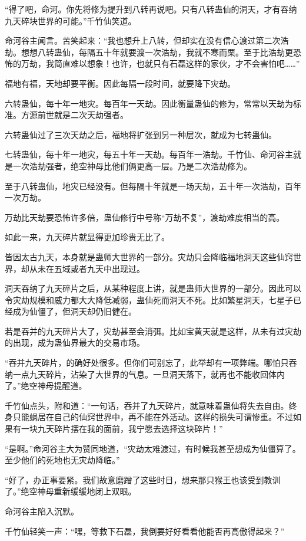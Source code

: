 \begin{this_body}
“得了吧，命河。你先将修为提升到八转再说吧。只有八转蛊仙的洞天，才有吞纳九天碎块世界的可能。”千竹仙笑道。

命河谷主闻言。苦笑起来：“我也想升上八转，但却实在没有信心渡过第二次浩劫。想想八转蛊仙，每隔五十年就要渡一次浩劫，我就不寒而栗。至于比浩劫更恐怖的万劫，我简直难以想象！也许，也就只有石磊这样的家伙，才不会害怕吧……”

福地有福，天地却要平衡。因此每隔一段时间，就要降下灾劫。

六转蛊仙，每十年一地灾。每百年一天劫。因此衡量蛊仙的修为，常常以天劫为标准。方源前世就是二次天劫强者。

六转蛊仙过了三次天劫之后，福地将扩张到另一种层次，就成为七转蛊仙。

七转蛊仙，每十年一地灾，每五十年一天劫。每百年一浩劫。千竹仙、命河谷主就是一次浩劫强者，绝空神母比他们俩更高一层。乃是二次浩劫修为。

至于八转蛊仙，地灾已经没有。但每隔十年就是一场天劫，五十年一次浩劫，百年一次万劫。

万劫比天劫要恐怖许多倍，蛊仙修行中号称“万劫不复”，渡劫难度相当的高。

如此一来，九天碎片就显得更加珍贵无比了。

皆因太古九天，本身就是蛊师大世界的一部分。灾劫只会降临福地洞天这些仙窍世界，却从未在五域或者九天中出现过。

洞天吞纳了九天碎片之后，从某种程度上讲，就是蛊师大世界的一部分。因此可以令灾劫规模和威力都大大降低减弱，蛊仙死而洞天不死。比如繁星洞天，七星子已经成为仙僵了，但洞天却仍旧健在。

若是吞并的九天碎片大了，灾劫甚至会消弭。比如宝黄天就是这样，从未有过灾劫的出现，成为蛊仙界最大的交易市场。

“吞并九天碎片，的确好处很多。但你们可别忘了，此举却有一项弊端。哪怕只吞纳一点九天碎片，沾染了大世界的气息。一旦洞天落下，就再也不能收回体内了。”绝空神母提醒道。

千竹仙点头，附和道：“一句话，吞并了九天碎片，就意味着蛊仙将失去自由。终身只能蜗居在自己的仙窍世界中，再不能在外活动。这样的损失可谓惨重。不过如果有一块九天碎片摆在我的面前，我宁愿去选择这块碎片！”

“是啊。”命河谷主大为赞同地道，“灾劫太难渡过，有时候我甚至想成为仙僵算了。至少他们的死地也无灾劫降临。”

“好了，办正事要紧。我们故意磨蹭了这些时日，想来那只猴王也该受到教训了。”绝空神母重新缓缓地闭上双眼。

命河谷主陷入沉默。

千竹仙轻笑一声：“嘿，等救下石磊，我倒要好好看看他能否再高傲得起来？”


\end{this_body}
